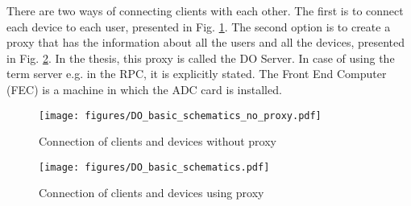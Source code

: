     There are two ways of connecting clients with each other. The first is to connect each device to each user, presented in Fig. \ref{fig:DO_schem_no_proxy}. The second option is to create a proxy that has the information about all the users and all the devices, presented in Fig. \ref{fig:DO_schem_proxy}. In the thesis, this proxy is called the DO Server. In case of using the term server e.g. in the RPC, it is explicitly stated. The Front End Computer (FEC) is a machine in which the ADC card is installed.

    \begin{figure}
    	\centerline{\texttt{[image: figures/DO\_basic\_schematics\_no\_proxy.pdf]}}
    	\caption{Connection of clients and devices without proxy}
    	\label{fig:DO_schem_no_proxy}
    \end{figure}
    
    \begin{figure}
    	\centerline{\texttt{[image: figures/DO\_basic\_schematics.pdf]}}
    	\caption{Connection of clients and devices using proxy}
    	\label{fig:DO_schem_proxy}
    \end{figure}
    
